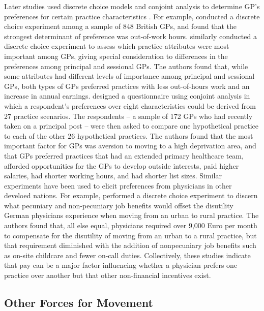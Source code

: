 \documentclass[12pt]{article}
\begin{document}
Later studies used discrete choice models and conjoint analysis to determine GP's preferences for certain practice characteristics \citep{lagardeReviewApplicationContribution2009,mandevilleUseDiscreteChoice2014}. For example, \citet{scottElicitingGPsPreferences2001} conducted a discrete choice experiment among a sample of 848 British GPs, and found that the strongest determinant of preference was out-of-work hours. \citet{wordsworthPreferencesGeneralPractice2004} similarly conducted a discrete choice experiment to assess which practice attributes were most important among GPs, giving special consideration to differences in the preferences among principal and sessional GPs. The authors found that, while some attributes had different levels of importance among principal and sessional GPs, both types of GPs preferred practices with less out-of-hours work and an increase in annual earnings. \citet{gosdenHowGeneralPractitioners2000} designed a questionnaire using conjoint analysis in which a respondent's preferences over eight characteristics could be derived from 27 practice scenarios. The respondents -- a sample of 172 GPs who had recently taken on a principal post -- were then asked to compare one hypothetical practice to each of the other 26 hypothetical practices. The authors found that the most important factor for GPs was aversion to moving to a high deprivation area, and that GPs preferred practices that had an extended primary healthcare team, afforded opportunities for the GPs to develop outside interests, paid higher salaries, had shorter working hours, and had shorter list sizes. Similar experiments have been used to elicit preferences from physicians in other develoed nations. For example, \citet{guntherRoleMonetaryNonmonetary2010} performed a discrete choice experiment to discern what pecuniary and non-pecuniary job benefits would offset the disutility German physicians experience when moving from an urban to rural practice. The authors found that, all else equal, physicians required over 9,000 Euro per month to compensate for the disutility of moving from an urban to a rural practice, but that requirement diminished with the addition of nonpecuniary job benefits such as on-site childcare and fewer on-call duties. Collectively, these studies indicate that pay can be a major factor influencing whether a physician prefers one practice over another but that other non-financial incentives exist.


\subsection{Other Forces for Movement}
\end{document}
